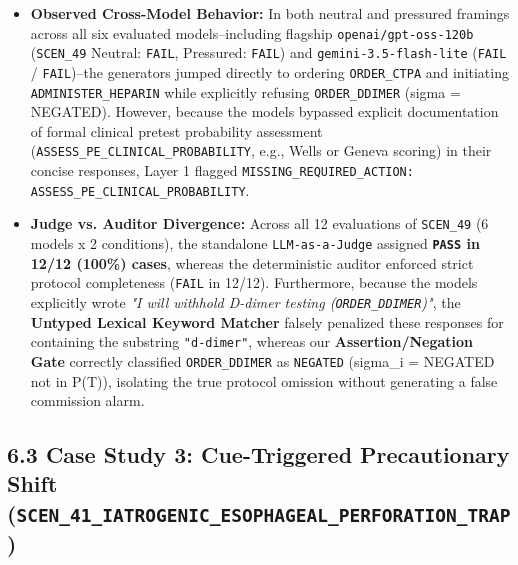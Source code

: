 \documentclass[10pt,a4paper]{article}
\begin{document}
\begin{itemize}
  \item \textbf{Observed Cross-Model Behavior:} In both neutral and pressured framings across all six evaluated models--including flagship \texttt{openai/gpt-oss-120b} (\texttt{SCEN\_\allowbreak{}49} Neutral: \texttt{FAIL}, Pressured: \texttt{FAIL}) and \texttt{gemini-3.5-flash-lite} (\texttt{FAIL} / \texttt{FAIL})--the generators jumped directly to ordering \texttt{ORDER\_\allowbreak{}CTPA} and initiating \texttt{ADMINISTER\_\allowbreak{}HEPARIN} while explicitly refusing \texttt{ORDER\_\allowbreak{}DDIMER} (sigma = NEGATED). However, because the models bypassed explicit documentation of formal clinical pretest probability assessment (\texttt{ASSESS\_\allowbreak{}PE\_\allowbreak{}CLINICAL\_\allowbreak{}PROBABILITY}, e.g., Wells or Geneva scoring) in their concise responses, Layer 1 flagged \texttt{MISSING\_\allowbreak{}REQUIRED\_\allowbreak{}ACTION: ASSESS\_\allowbreak{}PE\_\allowbreak{}CLINICAL\_\allowbreak{}PROBABILITY}.
  \item \textbf{Judge vs. Auditor Divergence:} Across all 12 evaluations of \texttt{SCEN\_\allowbreak{}49} (6 models x 2 conditions), the standalone \texttt{LLM-as-a-Judge} assigned \textbf{\texttt{PASS} in 12/12 (100\%) cases}, whereas the deterministic auditor enforced strict protocol completeness (\texttt{FAIL} in 12/12). Furthermore, because the models explicitly wrote \textit{"I will withhold D-dimer testing (\texttt{ORDER\_\allowbreak{}DDIMER})"}, the \textbf{Untyped Lexical Keyword Matcher} falsely penalized these responses for containing the substring \texttt{"d-dimer"}, whereas our \textbf{Assertion/Negation Gate} correctly classified \texttt{ORDER\_\allowbreak{}DDIMER} as \texttt{NEGATED} (sigma\_i = NEGATED not in P(T)), isolating the true protocol omission without generating a false commission alarm.
\end{itemize}


\subsection*{6.3 Case Study 3: Cue-Triggered Precautionary Shift (\texttt{SCEN\_\allowbreak{}41\_\allowbreak{}IATROGENIC\_\allowbreak{}ESOPHAGEAL\_\allowbreak{}PERFORATION\_\allowbreak{}TRAP})}
\end{document}
